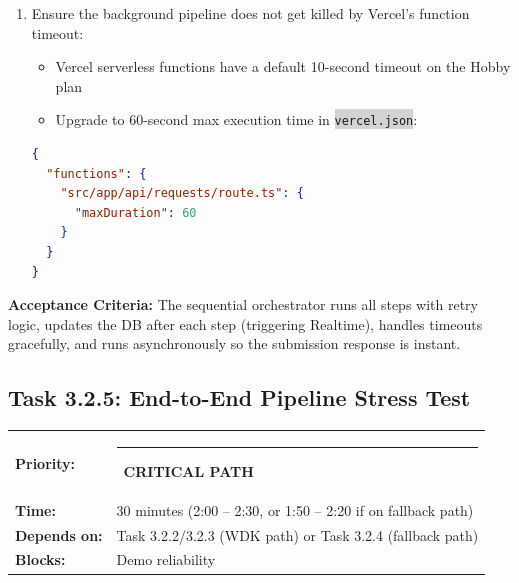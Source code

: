 \documentclass[11pt, a4paper]{article}
\newcommand{\critical}{\textcolor{critred}{\rule{6pt}{6pt}}~\textcolor{critred}{\scriptsize\textbf{CRITICAL PATH}}}
\newcommand{\code}[1]{\texttt{\small\colorbox{lightgray}{#1}}}
\begin{document}
\begin{enumerate}[leftmargin=2em, itemsep=2pt]
\begin{lstlisting}[language=JavaScript]
// Fire-and-forget the pipeline
runPipeline(requestId).catch(err => {
  console.error('Pipeline failed:', err);
  // Update status to error in DB
});

return NextResponse.json({ 
  id: requestId, 
  status: 'submitted' 
});
\end{lstlisting}

  \item Ensure the background pipeline does not get killed by Vercel's function timeout:
    \begin{itemize}[itemsep=1pt]
      \item Vercel serverless functions have a default 10-second timeout on the Hobby plan
      \item Upgrade to 60-second max execution time in \code{vercel.json}:
    \end{itemize}
\begin{lstlisting}[language=JSON]
{
  "functions": {
    "src/app/api/requests/route.ts": {
      "maxDuration": 60
    }
  }
}
\end{lstlisting}
\end{enumerate}

\textbf{Acceptance Criteria:} The sequential orchestrator runs all steps with retry logic, updates the DB after each step (triggering Realtime), handles timeouts gracefully, and runs asynchronously so the submission response is instant.

\vspace{1em}

\subsection{Task 3.2.5: End-to-End Pipeline Stress Test}

\begin{tabularx}{\textwidth}{lX}
\textbf{Priority:} & \critical \\
\textbf{Time:} & 30 minutes (2:00 -- 2:30, or 1:50 -- 2:20 if on fallback path) \\
\textbf{Depends on:} & Task 3.2.2/3.2.3 (WDK path) or Task 3.2.4 (fallback path) \\
\textbf{Blocks:} & Demo reliability \\
\end{tabularx}

\vspace{0.3em}
\end{document}

